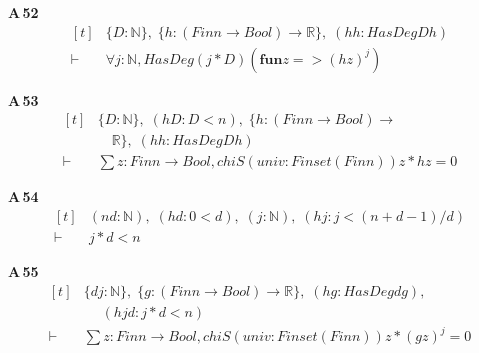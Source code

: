 \noindent\textbf{A\,52}\quad{}
{\footnotesize\[ \begin{aligned}[t]
&\{ \mathit{D} : \mathbb{N} \},\; \{ \mathit{h} : (\mathit{Fin} \mathit{n} \to \mathit{Bool}) \to \mathbb{R} \},\; (\mathit{hh} : \mathit{HasDeg} \mathit{D} \mathit{h})\\
\vdash\;&\forall \mathit{j} : \mathbb{N} , \mathit{HasDeg} (\mathit{j} * \mathit{D}) (\mathbf{fun} \mathit{z} => (\mathit{h} \mathit{z}) ^{\mathit{j}})
\end{aligned} \]}

\noindent\textbf{A\,53}\quad{}
{\footnotesize\[ \begin{aligned}[t]
&\{ \mathit{D} : \mathbb{N} \},\; (\mathit{hD} : \mathit{D} < \mathit{n}),\; \{ \mathit{h} : (\mathit{Fin} \mathit{n} \to \mathit{Bool}) \to\\
&\quad \mathbb{R} \},\; (\mathit{hh} : \mathit{HasDeg} \mathit{D} \mathit{h})\\
\vdash\;&\textstyle\sum \mathit{z} : \mathit{Fin} \mathit{n} \to \mathit{Bool}, \mathit{chiS} (\mathit{univ} : \mathit{Finset} (\mathit{Fin} \mathit{n})) \mathit{z} * \mathit{h} \mathit{z} = 0
\end{aligned} \]}

\noindent\textbf{A\,54}\quad{}
{\footnotesize\[ \begin{aligned}[t]
&(\mathit{n} \mathit{d} : \mathbb{N} ),\; (\mathit{hd} : 0 < \mathit{d}),\; (\mathit{j} : \mathbb{N} ),\; (\mathit{hj} : \mathit{j} < (\mathit{n} + \mathit{d} - 1) / \mathit{d})\\
\vdash\;&\mathit{j} * \mathit{d} < \mathit{n}
\end{aligned} \]}

\noindent\textbf{A\,55}\quad{}
{\footnotesize\[ \begin{aligned}[t]
&\{ \mathit{d} \mathit{j} : \mathbb{N} \},\; \{ \mathit{g} : (\mathit{Fin} \mathit{n} \to \mathit{Bool}) \to \mathbb{R} \},\; (\mathit{hg} : \mathit{HasDeg} \mathit{d} \mathit{g}),\\
&\quad \; (\mathit{hjd} : \mathit{j} * \mathit{d} < \mathit{n})\\
\vdash\;&\textstyle\sum \mathit{z} : \mathit{Fin} \mathit{n} \to \mathit{Bool}, \mathit{chiS} (\mathit{univ} : \mathit{Finset} (\mathit{Fin} \mathit{n})) \mathit{z} * (\mathit{g} \mathit{z}) ^{\mathit{j}} = 0
\end{aligned} \]}

